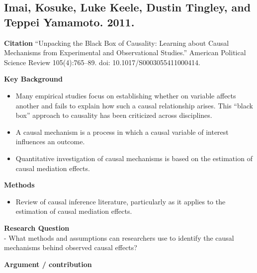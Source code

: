 \documentclass[
]{book}
\providecommand{\tightlist}{%
  \setlength{\itemsep}{0pt}\setlength{\parskip}{0pt}}
\begin{document}
\hypertarget{imai-kosuke-luke-keele-dustin-tingley-and-teppei-yamamoto.-2011.}{%
\subsection*{Imai, Kosuke, Luke Keele, Dustin Tingley, and Teppei Yamamoto. 2011.}\label{imai-kosuke-luke-keele-dustin-tingley-and-teppei-yamamoto.-2011.}}

\textbf{Citation} ``Unpacking the Black Box of Causality: Learning about Causal Mechanisms from Experimental and Observational Studies.'' American Political Science Review 105(4):765--89. doi: 10.1017/S0003055411000414.

\textbf{Key Background}

\begin{itemize}
\tightlist
\item
  Many empirical studies focus on establishing whether on variable affects another and fails to explain how such a causal relationship arises. This ``black box'' approach to causality has been criticized across disciplines.
\item
  A causal mechanism is a process in which a causal variable of interest influences an outcome.
\item
  Quantitative investigation of causal mechanisms is based on the estimation of causal mediation effects.
\end{itemize}

\textbf{Methods}

\begin{itemize}
\tightlist
\item
  Review of causal inference literature, particularly as it applies to the estimation of causal mediation effects.
\end{itemize}

\textbf{Research Question}\\
- What methods and assumptions can researchers use to identify the causal mechanisms behind observed causal effects?

\textbf{Argument / contribution}
\end{document}
